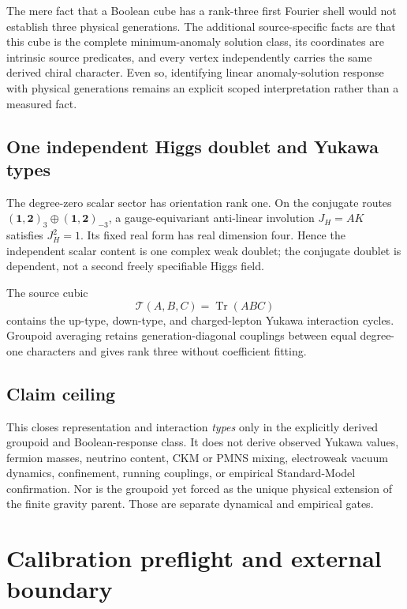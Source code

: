 \documentclass[11pt]{article}
\theoremstyle{definition}
\theoremstyle{remark}
\begin{document}
The mere fact that a Boolean cube has a rank-three first Fourier shell would not establish three physical generations. The additional source-specific facts are that this cube is the complete minimum-anomaly solution class, its coordinates are intrinsic source predicates, and every vertex independently carries the same derived chiral character. Even so, identifying linear anomaly-solution response with physical generations remains an explicit scoped interpretation rather than a measured fact.

\subsection{One independent Higgs doublet and Yukawa types}

The degree-zero scalar sector has orientation rank one. On the conjugate routes $(\mathbf1,\mathbf2)_3\oplus(\mathbf1,\mathbf2)_{-3}$, a gauge-equivariant anti-linear involution $J_H=AK$ satisfies $J_H^2=1$. Its fixed real form has real dimension four. Hence the independent scalar content is one complex weak doublet; the conjugate doublet is dependent, not a second freely specifiable Higgs field.

The source cubic
\begin{equation}
 \mathcal T(A,B,C)=\operatorname{Tr}(ABC)
\end{equation}
contains the up-type, down-type, and charged-lepton Yukawa interaction cycles. Groupoid averaging retains generation-diagonal couplings between equal degree-one characters and gives rank three without coefficient fitting.

\subsection{Claim ceiling}

This closes representation and interaction \emph{types} only in the explicitly derived groupoid and Boolean-response class. It does not derive observed Yukawa values, fermion masses, neutrino content, CKM or PMNS mixing, electroweak vacuum dynamics, confinement, running couplings, or empirical Standard-Model confirmation. Nor is the groupoid yet forced as the unique physical extension of the finite gravity parent. Those are separate dynamical and empirical gates.

\section{Calibration preflight and external boundary}\label{sec:calibration082}
\end{document}
